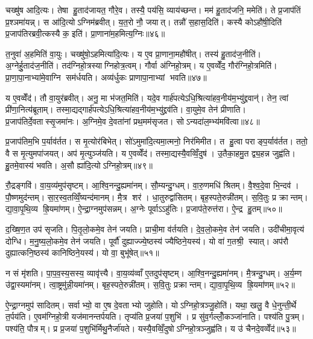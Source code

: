 चख्षु॑ष आदि॒त्यः। तेषा हु॒ताद॑जायत॒ गौरे॒व। तस्यै॒ पय॑सि॒ व्याय॑च्छन्त। मम॑ हु॒ताद॑जनि॒ ममेति॑। ते प्र॒जाप॑तिं प्र॒श्ञमा॑यन्न्। स आ॑दि॒त्योऽग्निम॑ब्रवीत्। य॒त॒रो नौ॒ जयात्। तन्नौ॑ स॒हास॒दिति॑। कस्यै कोऽहौ॑षी॒दिति॑ प्र॒जाप॑तिरब्रवी॒त्कस्यै क॒ इति॑। प्रा॒णाना॑म॒हमित्य॒ग्निः॥४६॥

त॒नुवा॑ अ॒हमिति॑ वा॒युः। चख्षु॑षो॒ऽहमित्या॑दि॒त्यः। य ए॒व प्रा॒णाना॒महौ॑षीत्। तस्य॑ हु॒ताद॑ज॒नीति॑। अ॒ग्नेर्\mbox{}हु॒ताद॑ज॒नीति॑। तद॑ग्निहो॒त्रस्याग्निहोत्र॒त्वम्। गौर्वा अ॑ग्निहो॒त्रम्। य ए॒वव्वेँद॒ गौर॑ग्निहो॒त्रमिति॑। प्रा॒णा॒पा॒नाभ्या॑मे॒वाग्नि सम॑र्धयति। अव्य॑र्धुकः प्राणापा॒नाभ्यां भवति॥४७॥

य ए॒वव्वेँद॑। तौ वा॒युर॑ब्रवीत्। अनु॒ मा भ॑जत॒मिति॑। यदे॒व गार्\mbox{}ह॑पत्येऽधि॒श्रित्या॑हव॒नीय॑म॒भ्यु॑द्द्रवान्॑। तेन॒ त्वां प्री॑णा॒नित्य॑ब्रूताम्। तस्मा॒द्यद्गार्\mbox{}ह॑पत्येऽधि॒श्रित्या॑हव॒नीय॑म॒भ्यु॑द्द्रव॑ति। वा॒युमे॒व तेन॑ प्रीणाति। प्र॒जाप॑तिर्दे॒वतास्सृ॒जमा॑नः। अ॒ग्निमे॒व दे॒वता॑नां प्रथ॒मम॑सृजत। सोऽन्यदा॑ल॒म्भ्य॑मवि॑त्वा॥४८॥

प्र॒जाप॑तिम॒भि प॒र्याव॑र्तत। स मृ॒त्योर॑बिभेत्। सो॑ऽमुमा॑दि॒त्यमा॒त्मनो॒ निर॑मिमीत। त हु॒त्वा पराङ्प॒र्याव॑र्तत। ततो॒ वै स मृ॒त्युमपा॑जयत्। अप॑ मृ॒त्युञ्ज॑यति। य ए॒वव्वेँद॑। तस्मा॒द्यस्यै॒वव्विँ॒दुष॑। उ॒तैका॒हमु॒त द्व्य॒हन्न जुह्व॑ति। हु॒तमे॒वास्य॑ भवति। अ॒सौ ह्या॑दि॒त्योऽग्निहो॒त्रम्॥४९॥\anuvakamend[त॒नुवै॑ वा॒युर॒ग्निर्भ॑व॒त्यवि॑त्वा भव॒त्येक॑ञ्च]

रौ॒द्रङ्गवि॑। वा॒य॒व्य॑मुप॑सृष्टम्। आ॒श्वि॒नन्दु॒ह्यमा॑नम्। सौ॒म्यन्दु॒ग्धम्। वा॒रु॒णमधि॑ श्रितम्। वै॒श्व॒दे॒वा भि॒न्दव॑। पौ॒ष्णमुद॑न्तम्। सा॒र॒स्व॒तव्विँ॒ष्यन्द॑मानम्। मै॒त्र शर॑। धा॒तुरुद्वा॑सितम्। बृह॒स्पते॒रुन्नी॑तम्। स॒वि॒तुः प्र क्रान्तम्। द्या॒वा॒पृ॒थि॒व्य ह्रि॒यमा॑णम्। ऐ॒न्द्रा॒ग्नमुप॑सन्नम्। अ॒ग्नेः पूर्वाऽऽहु॑तिः। प्र॒जाप॑ते॒रुत्त॑रा। ऐ॒न्द्र हु॒तम्॥५०॥\anuvakamend[उद्वा॑सित स॒प्त च॑]

द॒ख्षि॒ण॒त उप॑ सृजति। पि॒तृ॒लो॒कमे॒व तेन॑ जयति। प्राची॒मा व॑र्तयति। दे॒व॒लो॒कमे॒व तेन॑ जयति। उदी॑चीमा॒वृत्य॑ दोग्धि। म॒नु॒ष्य॒लो॒कमे॒व तेन॑ जयति। पूर्वौ॑ दुह्याज्ज्ये॒ष्ठस्य॑ ज्यैष्ठिने॒यस्य॑। यो वा॑ ग॒तश्री॒ स्यात्। अप॑रौ दुह्यात्कनि॒ष्ठस्य॑ कानिष्ठिने॒यस्य॑। यो वा॒ बुभू॑षेत्॥५१॥

न सं मृ॑शति। पा॒प॒व॒स्य॒सस्य॒ व्यावृ॑त्त्यै। वा॒य॒व्य॑व्वाँ ए॒तदुप॑सृष्टम्। आ॒श्वि॒नन्दु॒ह्यमा॑नम्। मै॒त्रन्दु॒ग्धम्। अ॒र्य॒म्ण उ॑द्वा॒स्यमा॑नम्। त्वा॒ष्ट्रमु॑न्नी॒यमा॑नम्। बृह॒स्पते॒रुन्नी॑तम्। स॒वि॒तुः प्रक्रान्तम्। द्या॒वा॒पृ॒थि॒व्य ह्रि॒यमा॑णम्॥५२॥

ऐ॒न्द्रा॒ग्नमुप॑ सादितम्। सर्वाभ्यो॒ वा ए॒ष दे॒वताभ्यो जुहोति। योऽग्निहो॒त्रञ्जु॒होति॑। यथा॒ खलु॒ वै धे॒नुन्ती॒र्थे त॒र्पय॑ति। ए॒वम॑ग्निहो॒त्री यज॑मानन्तर्पयति। तृप्य॑ति प्र॒जया॑ प॒शुभि॑। प्र सु॑व॒र्गल्लोँ॒कञ्जा॑नाति। पश्य॑ति पु॒त्रम्। पश्य॑ति॒ पौत्रम्। प्र प्र॒जया॑ प॒शुभि॑र्मिथु॒नैर्जा॑यते। यस्यै॒वव्विँ॒दुषोऽग्निहो॒त्रञ्जुह्व॑ति। य उ॑ चैनदे॒वव्वेँद॑॥५३॥\anuvakamend[बुभू॑षेद्ध्रि॒यमा॑णञ्जायते॒ द्वे च॑]

